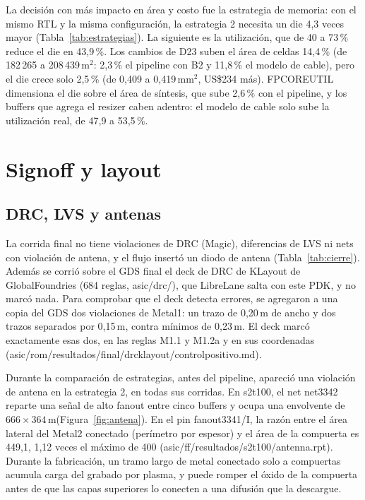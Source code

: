 \documentclass[11pt,a4paper]{article}
\DeclareRobustCommand{\sig}[1]{{\ttfamily\def\_{\textunderscore\allowbreak}#1}}
\newcommand{\um}{\,\textmu m\xspace}
\newcommand{\umd}{\,\textmu m$^2$\xspace}
\newcommand{\mmd}{\,mm$^2$\xspace}
\begin{document}
La decisión con más impacto en área y costo fue la estrategia de memoria: con el mismo RTL y la misma configuración, la estrategia 2 necesita un die 4,3 veces mayor (Tabla~\ref{tab:estrategias}). La siguiente es la utilización, que de 40 a 73\,\% reduce el die en 43,9\,\%. Los cambios de D23 suben el área de celdas 14,4\,\% (de 182\,265 a 208\,439\umd: 2,3\,\% el pipeline con B2 y 11,8\,\% el modelo de cable), pero el die crece solo 2,5\,\% (de 0,409 a 0,419\mmd, US\$234 más). \sig{FP\_CORE\_UTIL} dimensiona el die sobre el área de síntesis, que sube 2,6\,\% con el pipeline, y los buffers que agrega el resizer caben adentro: el modelo de cable solo sube la utilización real, de 47,9 a 53,5\,\%.

\section{Signoff y layout}
\label{sec:signoff}

\subsection{DRC, LVS y antenas}

La corrida final no tiene violaciones de DRC (Magic), diferencias de LVS ni nets con violación de antena, y el flujo insertó un diodo de antena (Tabla~\ref{tab:cierre}). Además se corrió sobre el GDS final el deck de DRC de KLayout de GlobalFoundries (684 reglas, \sig{asic/drc/}), que LibreLane salta con este PDK, y no marcó nada. Para comprobar que el deck detecta errores, se agregaron a una copia del GDS dos violaciones de Metal1: un trazo de 0,20\um de ancho y dos trazos separados por 0,15\um, contra mínimos de 0,23\um. El deck marcó exactamente esas dos, en las reglas M1.1 y M1.2a y en sus coordenadas (\sig{asic/rom/resultados/final/drc\_klayout/control\_positivo.md}).

Durante la comparación de estrategias, antes del pipeline, apareció una violación de antena en la estrategia 2, en todas sus corridas. En \sig{s2\_t100}, el net \sig{net3342} reparte una señal de alto fanout entre cinco buffers y ocupa una envolvente de $666 \times 364$\um (Figura~\ref{fig:antena}). En el pin \sig{fanout3341/I}, la razón entre el área lateral del Metal2 conectado (perímetro por espesor) y el área de la compuerta es 449,1, 1,12 veces el máximo de 400 (\sig{asic/ff/resultados/s2\_t100/antenna.rpt}). Durante la fabricación, un tramo largo de metal conectado solo a compuertas acumula carga del grabado por plasma, y puede romper el óxido de la compuerta antes de que las capas superiores lo conecten a una difusión que la descargue.
\end{document}
